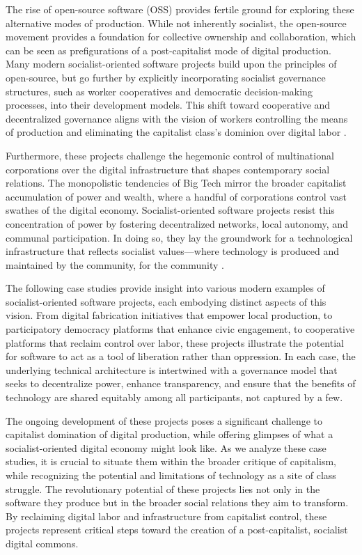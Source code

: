 \begin{refsection}
The rise of open-source software (OSS) provides fertile ground for exploring these alternative modes of production. While not inherently socialist, the open-source movement provides a foundation for collective ownership and collaboration, which can be seen as prefigurations of a post-capitalist mode of digital production. Many modern socialist-oriented software projects build upon the principles of open-source, but go further by explicitly incorporating socialist governance structures, such as worker cooperatives and democratic decision-making processes, into their development models. This shift toward cooperative and decentralized governance aligns with the vision of workers controlling the means of production and eliminating the capitalist class's dominion over digital labor \cite[pp.~23-41]{stallman2010}.

Furthermore, these projects challenge the hegemonic control of multinational corporations over the digital infrastructure that shapes contemporary social relations. The monopolistic tendencies of Big Tech mirror the broader capitalist accumulation of power and wealth, where a handful of corporations control vast swathes of the digital economy. Socialist-oriented software projects resist this concentration of power by fostering decentralized networks, local autonomy, and communal participation. In doing so, they lay the groundwork for a technological infrastructure that reflects socialist values—where technology is produced and maintained by the community, for the community \cite[pp.~77-98]{harvey2010}.

The following case studies provide insight into various modern examples of socialist-oriented software projects, each embodying distinct aspects of this vision. From digital fabrication initiatives that empower local production, to participatory democracy platforms that enhance civic engagement, to cooperative platforms that reclaim control over labor, these projects illustrate the potential for software to act as a tool of liberation rather than oppression. In each case, the underlying technical architecture is intertwined with a governance model that seeks to decentralize power, enhance transparency, and ensure that the benefits of technology are shared equitably among all participants, not captured by a few.

The ongoing development of these projects poses a significant challenge to capitalist domination of digital production, while offering glimpses of what a socialist-oriented digital economy might look like. As we analyze these case studies, it is crucial to situate them within the broader critique of capitalism, while recognizing the potential and limitations of technology as a site of class struggle. The revolutionary potential of these projects lies not only in the software they produce but in the broader social relations they aim to transform. By reclaiming digital labor and infrastructure from capitalist control, these projects represent critical steps toward the creation of a post-capitalist, socialist digital commons.


\end{refsection}
